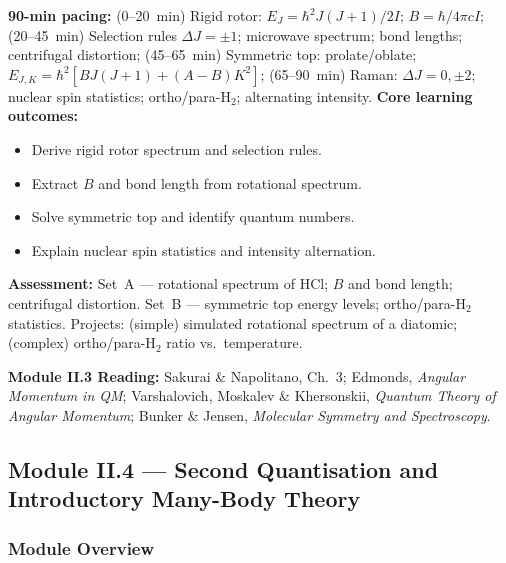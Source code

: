 \documentclass[11pt,a4paper]{article}
\begin{document}
\medskip

\begin{tcolorbox}[modulebox, title={Module~II.3 --- Lecture L12: Rotational Spectroscopy}]
\textbf{90-min pacing:} (0--20~min) Rigid rotor: $E_J=\hbar^2J(J+1)/2I$; $B=\hbar/4\pi cI$; (20--45~min) Selection rules $\Delta J=\pm1$; microwave spectrum; bond lengths; centrifugal distortion; (45--65~min) Symmetric top: prolate/oblate; $E_{J,K}=\hbar^2[BJ(J+1)+(A-B)K^2]$; (65--90~min) Raman: $\Delta J=0,\pm2$; nuclear spin statistics; ortho/para-H$_2$; alternating intensity.
\medskip\textbf{Core learning outcomes:}
\begin{itemize}[leftmargin=1.4em,topsep=2pt,itemsep=1pt]
  \item Derive rigid rotor spectrum and selection rules.
  \item Extract $B$ and bond length from rotational spectrum.
  \item Solve symmetric top and identify quantum numbers.
  \item Explain nuclear spin statistics and intensity alternation.
\end{itemize}
\medskip\textbf{Assessment:}
Set~A --- rotational spectrum of HCl; $B$ and bond length; centrifugal distortion.
Set~B --- symmetric top energy levels; ortho/para-H$_2$ statistics.
Projects: (simple) simulated rotational spectrum of a diatomic; (complex) ortho/para-H$_2$ ratio vs.\ temperature.
\end{tcolorbox}

\begin{tcolorbox}[highlightbox]
\textbf{Module II.3 Reading:} Sakurai \& Napolitano, Ch.~3; Edmonds, \textit{Angular Momentum in QM}; Varshalovich, Moskalev \& Khersonskii, \textit{Quantum Theory of Angular Momentum}; Bunker \& Jensen, \textit{Molecular Symmetry and Spectroscopy}.
\end{tcolorbox}

\subsection{Module II.4 --- Second Quantisation and Introductory Many-Body Theory}
\label{sec:mod-II4}

\subsubsection*{Module Overview}
\end{document}
